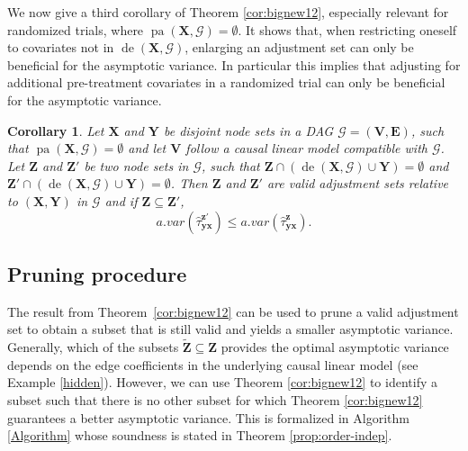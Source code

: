 \documentclass[11pt,a4paper]{article}
\newtheorem{Corollary}[Satz]{Corollary}
\theoremstyle{definition}
\theoremstyle{remark}
\DeclareMathOperator{\pa}{pa}
\DeclareMathOperator{\de}{de}
\newcommand{\g}[1][G]{\mathcal{#1}}
\begin{document}
We now give a third corollary of Theorem \ref{cor:bignew12}, especially relevant for randomized trials, where $\pa(\mathbf{X},\g)=\emptyset$. It shows that, when restricting oneself to covariates not in $\de(\mathbf{X},\g)$, enlarging an adjustment set can only be beneficial for the asymptotic variance.  In particular this implies that adjusting for additional pre-treatment covariates in a randomized trial can only be beneficial for the asymptotic variance. 




\begin{Corollary}
	Let $\mathbf{X}$ and $\mathbf{Y}$ be disjoint node sets in a DAG $\g = (\mathbf{V},\mathbf{E})$, such that $\pa(\mathbf{X},\g)=\emptyset$ and let $\mathbf{V}$ follow a causal linear model compatible with $\g$. Let $\mathbf{Z}$  and $\mathbf{Z}'$ be two node sets in $\g$, such that $\mathbf{Z} \cap (\de(\mathbf{X},\g)\cup\mathbf{Y}) = \emptyset $ and $\mathbf{Z'} \cap (\de(\mathbf{X},\g)\cup\mathbf{Y}) = \emptyset$. Then $\mathbf{Z}$ and $\mathbf{Z'}$ are valid adjustment sets relative to $(\mathbf{X},\mathbf{Y})$ in $\g$ and if $\mathbf{Z} \subseteq \mathbf{Z}'$,
	\[
	a.var(\hat{\tau}_{\mathbf{yx}}^{\mathbf{z'}}) \leq 
	a.var(\hat{\tau}_{\mathbf{yx}}^{\mathbf{z}}).
	\]
	\label{cor:pretreatment}
\end{Corollary}

\subsection{Pruning procedure}

\label{sec:prune}


The result from Theorem~\ref{cor:bignew12} can be used to prune a valid adjustment set to obtain a subset that is still valid and yields a smaller asymptotic variance. 
Generally, which of the subsets $\mathbf{\tilde{Z}} \subseteq \mathbf{Z}$ provides the optimal asymptotic variance depends on the edge coefficients in the underlying causal linear model (see Example \ref{hidden}).
However, we can use Theorem \ref{cor:bignew12} to identify a subset such that there is no other subset for which Theorem \ref{cor:bignew12} guarantees a better asymptotic variance. 
This is formalized in Algorithm \ref{Algorithm} whose soundness is stated in Theorem \ref{prop:order-indep}.
\end{document}
